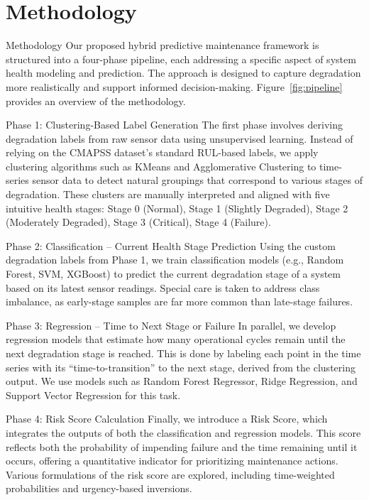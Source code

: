 \section{Methodology}
\label{sec:methodology}

Methodology
Our proposed hybrid predictive maintenance framework is structured into a four-phase pipeline, each addressing a specific aspect of system health modeling and prediction. The approach is designed to capture degradation more realistically and support informed decision-making. Figure~\ref{fig:pipeline} provides an overview of the methodology.

Phase 1: Clustering-Based Label Generation
The first phase involves deriving degradation labels from raw sensor data using unsupervised learning. Instead of relying on the CMAPSS dataset’s standard RUL-based labels, we apply clustering algorithms such as KMeans and Agglomerative Clustering to time-series sensor data to detect natural groupings that correspond to various stages of degradation. These clusters are manually interpreted and aligned with five intuitive health stages:
Stage 0 (Normal), Stage 1 (Slightly Degraded), Stage 2 (Moderately Degraded), Stage 3 (Critical), Stage 4 (Failure).

Phase 2: Classification – Current Health Stage Prediction
Using the custom degradation labels from Phase 1, we train classification models (e.g., Random Forest, SVM, XGBoost) to predict the current degradation stage of a system based on its latest sensor readings. Special care is taken to address class imbalance, as early-stage samples are far more common than late-stage failures.

Phase 3: Regression – Time to Next Stage or Failure
In parallel, we develop regression models that estimate how many operational cycles remain until the next degradation stage is reached. This is done by labeling each point in the time series with its “time-to-transition” to the next stage, derived from the clustering output. We use models such as Random Forest Regressor, Ridge Regression, and Support Vector Regression for this task.

Phase 4: Risk Score Calculation
Finally, we introduce a Risk Score, which integrates the outputs of both the classification and regression models. This score reflects both the probability of impending failure and the time remaining until it occurs, offering a quantitative indicator for prioritizing maintenance actions. Various formulations of the risk score are explored, including time-weighted probabilities and urgency-based inversions.

